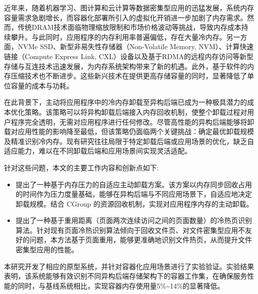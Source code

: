 	
\begin{chineseabstract}

近年来，随着机器学习、图计算和云计算等数据密集型应用的迅猛发展，系统内存容量需求急剧增长，而容器化部署所引入的虚拟化开销进一步加剧了内存需求。然而，传统DRAM技术面临物理缩放限制和市场价格波动等挑战，导致内存成本持续攀升。与此同时，应用程序的内存利用率普遍偏低，存在大量冷内存。另一方面，NVMe SSD、新型非易失性存储器（Non-Volatile Memory, NVM）、计算快速链接（Compute Express Link, CXL）设备以及基于RDMA的远程内存访问等新型存储与互连技术迅速发展，为内存系统架构带来了新的机遇。此外，基于软件的内存压缩技术也不断进步。这些新兴技术在提供更高存储容量的同时，显著降低了单位容量的成本与功耗。

在此背景下，主动将应用程序中的冷内存卸载至异构后端已成为一种极具潜力的成本优化策略。该策略可以将异构卸载后端接入内存回收机制，使整个卸载过程对用户程序完全透明，无需对应用程序进行任何修改。尽管高性能的异构后端能够将卸载对应用性能的影响降至最低，但该策略仍面临两个关键挑战：确定最优卸载规模及精准识别冷内存。现有研究往往局限于特定卸载后端或应用场景的优化，缺乏自适应能力，难以在不同卸载后端和应用场景间实现灵活适配。

针对这些问题，本文的主要工作内容和创新点如下:
\begin{itemize}
    \item 提出了一种基于内存压力的自适应主动卸载方案。该方案以内存同步回收占用的时间作为压力度量基础，能够在异构后端与不同应用场景下，自适应地决定卸载规模。结合 CGroup 的资源回收机制，实现对应用程序内存的主动卸载。
    \item 提出了一种基于重用距离（页面两次连续访问之间的页面数量）的冷热页识别算法。针对现有页面冷热识别算法倾向于回收文件页、对文件密集型应用不友好的问题，本方法基于页面重用，能够更准确地识别文件热页，从而提升文件密集型应用的性能。
\end{itemize}

本研究开发了相应的原型系统，并针对容器化应用场景进行了实验验证。实验结果表明，该系统能够有效识别不同异构后端存储架构下的容器工作集，在确保服务性能的同时，与基线系统相比，实现容器内存使用量5\%\~{}14\%的显著降低。

\end{chineseabstract}